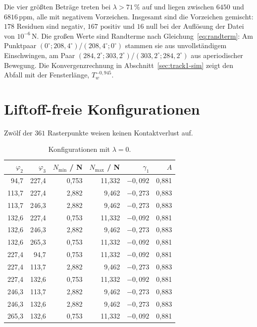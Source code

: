 \documentclass[12pt,a4paper]{report}
\begin{document}
Die vier größten Beträge treten bei $\lambda > 71\,\%$ auf und liegen
zwischen $6450$ und $6816\,\mathrm{ppm}$, alle mit negativem Vorzeichen.
Insgesamt sind die Vorzeichen gemischt: $178$ Residuen sind negativ,
$167$ positiv und $16$ null bei der Auflösung der Datei von
$10^{-6}\,\mathrm{N}$. Die großen Werte sind Randterme nach
Gleichung~\eqref{eq:randterm}: Am Punktpaar
$(0^\circ; 208{,}4^\circ)$/$(208{,}4^\circ; 0^\circ)$ stammen sie aus
unvollständigem Einschwingen, am Paar
$(284{,}2^\circ; 303{,}2^\circ)$/$(303{,}2^\circ; 284{,}2^\circ)$ aus
aperiodischer Bewegung. Die Konvergenzrechnung in
Abschnitt~\ref{sec:track1-sim} zeigt den Abfall mit der Fensterlänge,
$T_w^{-0{,}945}$.

\section{Liftoff-freie Konfigurationen}

Zwölf der $361$ Rasterpunkte weisen keinen Kontaktverlust auf.

\begin{table}[htbp]
  \centering
  \begin{tabular}{rrrrrr}
    \hline
    $\varphi_2$ & $\varphi_3$ & $N_{\min}$ / N & $N_{\max}$ / N & $\gamma_1$ & $A$ \\
    \hline
     94{,}7 & 227{,}4 & 0{,}753 & 11{,}332 & $-0{,}092$ & 0{,}881 \\
    113{,}7 & 227{,}4 & 2{,}882 &  9{,}462 & $-0{,}273$ & 0{,}883 \\
    113{,}7 & 246{,}3 & 2{,}882 &  9{,}462 & $-0{,}273$ & 0{,}883 \\
    132{,}6 & 227{,}4 & 0{,}753 & 11{,}332 & $-0{,}092$ & 0{,}881 \\
    132{,}6 & 246{,}3 & 2{,}882 &  9{,}462 & $-0{,}273$ & 0{,}883 \\
    132{,}6 & 265{,}3 & 0{,}753 & 11{,}332 & $-0{,}092$ & 0{,}881 \\
    227{,}4 &  94{,}7 & 0{,}753 & 11{,}332 & $-0{,}092$ & 0{,}881 \\
    227{,}4 & 113{,}7 & 2{,}882 &  9{,}462 & $-0{,}273$ & 0{,}883 \\
    227{,}4 & 132{,}6 & 0{,}753 & 11{,}332 & $-0{,}092$ & 0{,}881 \\
    246{,}3 & 113{,}7 & 2{,}882 &  9{,}462 & $-0{,}273$ & 0{,}883 \\
    246{,}3 & 132{,}6 & 2{,}882 &  9{,}462 & $-0{,}273$ & 0{,}883 \\
    265{,}3 & 132{,}6 & 0{,}753 & 11{,}332 & $-0{,}092$ & 0{,}881 \\
    \hline
  \end{tabular}
  \caption{Konfigurationen mit $\lambda = 0$.}
  \label{tab:liftoff-frei}
\end{table}
\end{document}
